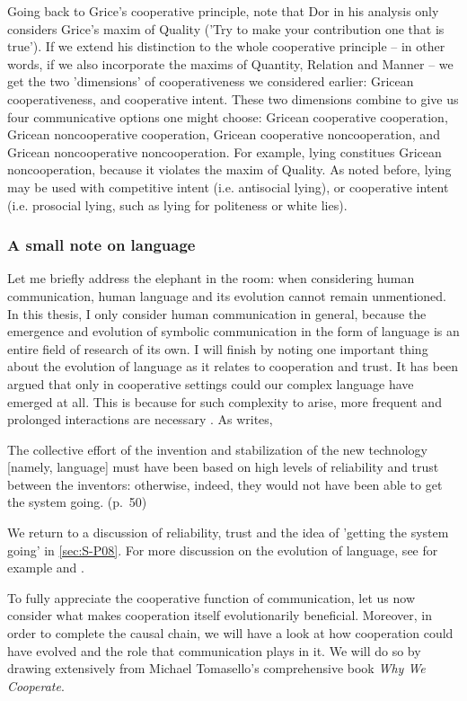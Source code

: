 Going back to Grice's cooperative principle, note that Dor in his analysis only considers Grice's maxim of Quality ('Try to make your contribution one that is true'). If we extend his distinction to the whole cooperative principle -- in other words, if we also incorporate the maxims of Quantity, Relation and Manner -- we get the two 'dimensions' of cooperativeness we considered earlier: Gricean cooperativeness, and cooperative intent.
These two dimensions combine to give us four communicative options one might choose: Gricean cooperative cooperation, Gricean noncooperative cooperation, Gricean cooperative noncooperation, and Gricean noncooperative noncooperation.
For example, lying constitues Gricean noncooperation, because it violates the maxim of Quality. As noted before, lying may be used with competitive intent (i.e. antisocial lying), or cooperative intent (i.e. prosocial lying, such as lying for politeness or white lies).

\subsubsection{A small note on language}

Let me briefly address the elephant in the room: when considering human communication, human language and its evolution cannot remain unmentioned. In this thesis, I only consider human communication in general, because the emergence and evolution of symbolic communication in the form of language is an entire field of research of its own.
I will finish by noting one important thing about the evolution of language as it relates to cooperation and trust. It has been argued that only in cooperative settings could our complex language have emerged at all. This is because for such complexity to arise, more frequent and prolonged interactions are necessary \citep{Benitez21}. As \citet{Dor17} writes,
\begin{quoting}
    The collective effort of the invention and stabilization of the new technology [namely, language] must have been based on high levels of reliability and trust between the inventors: otherwise, indeed, they would not have been able to get the system going.
    \hfill (p.~50)
\end{quoting}
We return to a discussion of reliability, trust and the idea of 'getting the system going' in \cref{sec:S-P08}. For more discussion on the evolution of language, see for example \citet{Tomasello08} and \citet{Dor17}.

To fully appreciate the cooperative function of communication, let us now consider what makes cooperation itself evolutionarily beneficial. Moreover, in order to complete the causal chain, we will have a look at how cooperation could have evolved and the role that communication plays in it. We will do so by drawing extensively from Michael Tomasello's comprehensive \citeyear{Tomasello09} book \emph{Why We Cooperate}.


